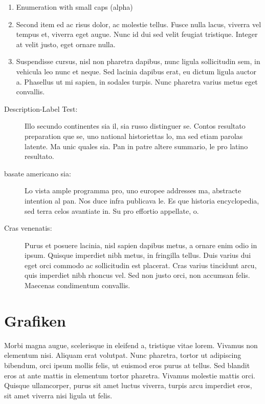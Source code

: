 \begin{enumerate}
 \item Enumeration with small caps (alpha)
 \item Second item ed ac risus dolor, ac molestie tellus. Fusce nulla lacus, viverra vel tempus et, viverra eget augue. Nunc id dui sed velit feugiat tristique. Integer at velit justo, eget ornare nulla.
 \item Suspendisse cursus, nisl non pharetra dapibus, nunc ligula sollicitudin sem, in vehicula leo nunc et neque. Sed lacinia dapibus erat, eu dictum ligula auctor a. Phasellus ut mi sapien, in sodales turpis. Nunc pharetra varius metus eget convallis.
\end{enumerate}


\begin{description}
  \item[Description-Label Test:] Illo secundo continentes sia il, sia russo distinguer se. Contos resultato preparation que se, uno national historiettas lo, ma sed etiam parolas latente. Ma unic quales sia. Pan in patre altere summario, le pro latino resultato.
  \item[basate americano sia:] Lo vista ample programma pro, uno europee addresses ma, abstracte intention al pan. Nos duce infra publicava le. Es que historia encyclopedia, sed terra celos avantiate in. Su pro effortio appellate, o.
  \item[Cras venenatis:] Purus et posuere lacinia, nisl sapien dapibus metus, a ornare enim odio in ipsum. Quisque imperdiet nibh metus, in fringilla tellus. Duis varius dui eget orci commodo ac sollicitudin est placerat. Cras varius tincidunt arcu, quis imperdiet nibh rhoncus vel. Sed non justo orci, non accumsan felis. Maecenas condimentum convallis.
\end{description}

%
%
\section{Grafiken}
\label{sec:chapter03:grafiken}
Morbi magna augue, scelerisque in eleifend a, tristique vitae lorem. Vivamus non elementum nisi. Aliquam erat volutpat. Nunc pharetra, tortor ut adipiscing bibendum, orci ipsum mollis felis, ut euismod eros purus at tellus. Sed blandit eros at ante mattis in elementum tortor pharetra. Vivamus molestie mattis orci. Quisque ullamcorper, purus sit amet luctus viverra, turpis arcu imperdiet eros, sit amet viverra nisi ligula ut felis.

